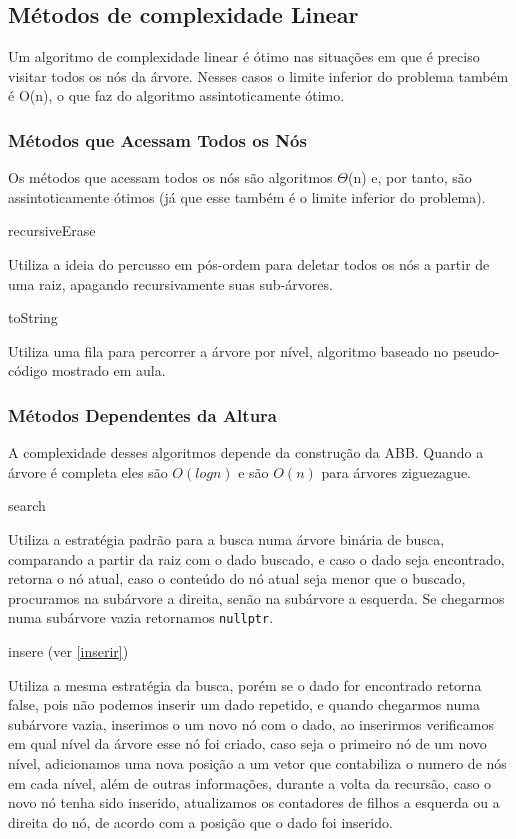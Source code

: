 
\subsection{Métodos de complexidade Linear}

Um algoritmo de complexidade linear é ótimo nas situações em que é preciso 
visitar todos os nós da árvore. Nesses casos o limite inferior do problema 
também é O(n), o que faz do algoritmo assintoticamente ótimo.

\subsubsection{Métodos que Acessam Todos os Nós}

Os métodos que acessam todos os nós são algoritmos $\Theta$(n) e, por tanto,
 são assintoticamente ótimos (já que esse também é o limite inferior do 
 problema).

\textsf{recursiveErase}

Utiliza a ideia do percusso em pós-ordem para deletar todos os nós a partir de 
uma raiz, apagando recursivamente suas sub-árvores. 

\textsf{toString}

Utiliza uma fila para percorrer a árvore por nível, algoritmo baseado no 
pseudo-código mostrado em aula.

\subsubsection{Métodos Dependentes da Altura}

A complexidade desses algoritmos depende da construção da ABB. Quando a 
árvore é completa eles são $O(log n)$ e são $O(n)$ para árvores ziguezague.

\textsf{search}

Utiliza a estratégia padrão para a busca numa árvore binária de busca, 
comparando a partir da raiz com o dado buscado, e caso o dado seja encontrado, 
retorna o nó atual, caso o conteúdo do nó atual seja menor que o buscado, 
procuramos na subárvore a direita, senão na subárvore a esquerda. Se chegarmos 
numa subárvore vazia retornamos \texttt{nullptr}.

\textsf{insere} (ver \autoref{inserir})

Utiliza a mesma estratégia da busca, porém se o dado for encontrado retorna 
false, pois não podemos inserir um dado repetido, e quando chegarmos numa 
subárvore vazia, inserimos o um novo nó com o dado, ao inserirmos verificamos 
em qual nível da árvore esse nó foi criado, caso seja o primeiro nó de um novo 
nível, adicionamos uma nova posição a um vetor que contabiliza o numero de nós 
em cada nível, além de outras informações, durante a volta da recursão, caso o 
novo nó tenha sido inserido, atualizamos os contadores de filhos a esquerda ou 
a direita do nó, de acordo com a posição que o dado foi inserido.

